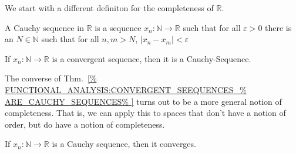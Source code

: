 \documentclass[crop=false,class=article,oneside]{standalone}
\begin{document}
            We start with a different definiton for the completeness
            of $\mathbb{R}$.
            \begin{definition}
                A Cauchy sequence in $\mathbb{R}$ is a sequence
                $x_{n}:\mathbb{N}\rightarrow\mathbb{R}$ such that
                for all $\varepsilon>0$ there is an $N\in\mathbb{N}$
                such that for all $n,m>N$, $|x_{n}-x_{m}|<\varepsilon$
            \end{definition}
            \begin{theorem}
                \label{%
                    FUNCTIONAL_ANALYSIS:CONVERGENT_SEEQUENCES_%
                    ARE_CAUCHY_SEQUENCES%
                }
                If $x_{n}:\mathbb{N}\rightarrow\mathbb{R}$ is a 
                convergent sequence, then it is a Cauchy-Sequence.
            \end{theorem}
            The converse of Thm.~\ref{%
                FUNCTIONAL_ANALYSIS:CONVERGENT_SEEQUENCES_%
                ARE_CAUCHY_SEQUENCES%
            }
            turns out to be a more general notion of completeness.
            That is, we can apply this to spaces that don't have
            a notion of order, but do have a notion of completeness.
            \begin{theorem}
                If $x_{n}:\mathbb{N}\rightarrow\mathbb{R}$ is
                a Cauchy sequence, then it converges.
            \end{theorem}
\end{document}
